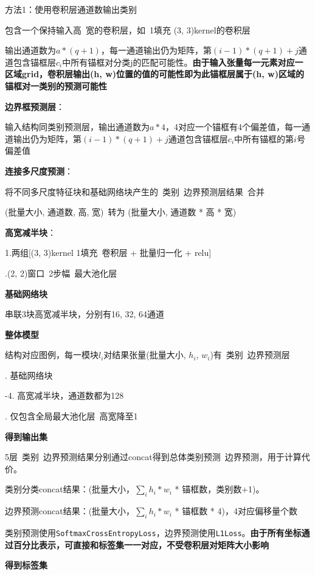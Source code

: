 \documentclass[UTF8]{ctexart}
\begin{document}
  \quad 方法1：使用卷积层通道数输出类别

  \quad \quad 包含一个保持输入高\ 宽的卷积层，如\ 1填充 (3, 3)kernel的卷积层

  \quad \quad 输出通道数为$a * (q+1)$，每一通道输出仍为矩阵，第$(i-1)*(q+1) + j$通道包含锚框层$c_i$中所有锚框对分类j的匹配可能性。\textbf{由于输入张量每一元素对应一区域grid，卷积层输出(h, w)位置的值的可能性即为此锚框层属于(h, w)区域的锚框对一类别的预测可能性}

  \textbf{边界框预测层}：

  \quad 输入结构同类别预测层，输出通道数为$a * 4$，4对应一个锚框有4个偏差值，每一通道输出仍为矩阵，第$(i-1)*(q+1) + j$通道包含锚框层$c_i$中所有锚框的第$i$号偏差值

  \textbf{连接多尺度预测}：

  \quad 将不同多尺度特征块和基础网络块产生的\ 类别\ 边界预测层结果\ 合并
  
  \quad (批量大小, 通道数, 高, 宽)\ 转为 (批量大小, 通道数 * 高 * 宽)
  
  \textbf{高宽减半块}：

  \quad 1.两组[(3, 3)kernel 1填充\ 卷积层 + 批量归一化 + relu]
  
  .(2, 2)窗口\ 2步幅\ 最大池化层

  \textbf{基础网络块}

  串联3块高宽减半块，分别有16, 32, 64通道

  \textbf{整体模型}
  
  \quad 结构对应图例，每一模块$l_i$对结果张量(批量大小, $h_i$, $w_i$)有\ 类别\ 边界预测层

  . 基础网络块

  -4. 高宽减半块，通道数都为128

  . 仅包含全局最大池化层\ 高宽降至1

  \quad \textbf{得到输出集}

  \quad \quad 5层\ 类别\ 边界预测结果分别通过concat得到总体类别预测\ 边界预测，用于计算代价。

  \quad \quad \quad 类别分类concat结果：(批量大小，$\sum_i h_i * w_i$ * 锚框数，类别数+1)。

  \quad \quad \quad 边界预测concat结果：(批量大小，$\sum_i h_i * w_i$ * 锚框数 * 4)，4对应偏移量个数
  
  \quad \quad 类别预测使用\texttt{SoftmaxCrossEntropyLoss}，边界预测使用\texttt{L1Loss}。\textbf{由于所有坐标通过百分比表示，可直接和标签集一一对应，不受卷积层对矩阵大小影响}

  \quad \textbf{得到标签集}
\end{document}
